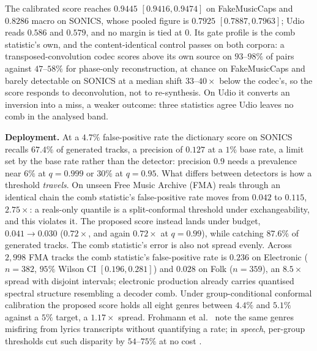 \documentclass{article}
\begin{document}
The calibrated score reaches $0.9445$ $[0.9416, 0.9474]$ on FakeMusicCaps and
$0.8286$ macro on SONICS, whose pooled figure is $0.7925$ $[0.7887, 0.7963]$; Udio
reads $0.586$ and $0.579$, and no margin is tied at $0$. Its gate profile is the
comb statistic's own, and the content-identical control passes on both corpora: a
transposed-convolution codec \cite{defossez2023encodec} scores above its own source
on $93$--$98\%$ of pairs against $47$--$58\%$ for phase-only reconstruction, at
chance on FakeMusicCaps and barely detectable on SONICS at a median shift
$33$--$40\times$ below the codec's, so the score responds to deconvolution, not to
re-synthesis. On Udio it converts an inversion into a miss, a weaker outcome: three
statistics agree Udio leaves no comb in the analysed band.

\noindent\textbf{Deployment.}\label{sec:deployment} At a $4.7\%$
false-positive rate the dictionary score on SONICS recalls $67.4\%$ of generated
tracks, a precision of $0.127$ at a $1\%$ base rate, a limit set by the base rate
rather than the detector: precision $0.9$ needs a prevalence near $6\%$ at
$q{=}0.999$ or $30\%$ at $q{=}0.95$. What differs between detectors is how a
threshold \emph{travels}. On unseen Free Music Archive (FMA)
\cite{defferrard2017fma} reals through an identical chain the comb statistic's
false-positive rate moves from $0.042$ to $0.115$, $2.75\times$: a reals-only
quantile is a split-conformal threshold under exchangeability, and this violates
it. The proposed score instead lands under budget, $0.041 \to 0.030$ ($0.72\times$,
and again $0.72\times$ at $q{=}0.99$), while catching $87.6\%$ of generated tracks.
The comb statistic's error is also not spread evenly. Across $2{,}998$
FMA tracks the comb statistic's false-positive rate is $0.236$ on Electronic
($n = 382$, $95\%$ Wilson CI $[0.196, 0.281]$) and $0.028$ on Folk ($n = 359$), an
$8.5\times$ spread with disjoint intervals; electronic production already carries
quantised spectral structure resembling a decoder comb. Under group-conditional
conformal calibration the proposed score holds all eight genres between $4.4\%$ and
$5.1\%$ against a $5\%$ target, a $1.17\times$ spread. Frohmann et al.\
\cite{frohmann2025lyrics} note the same genres misfiring from lyrics transcripts
without quantifying a rate; in \emph{speech}, per-group thresholds cut such
disparity by $54$--$75\%$ at no cost \cite{fursule2026gender}.
\end{document}
